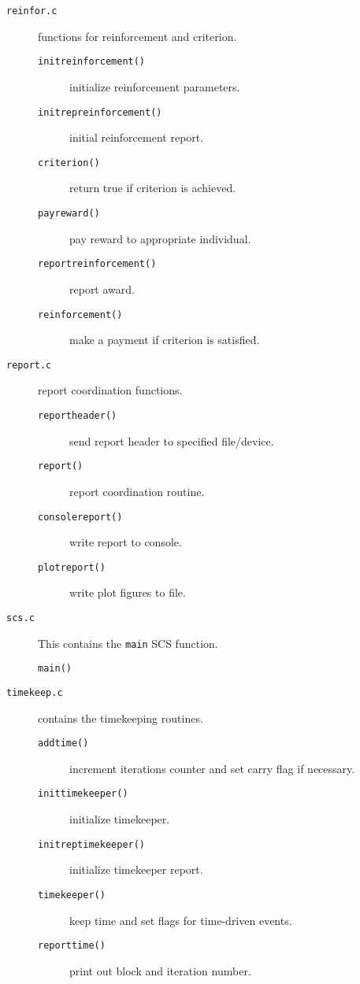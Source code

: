 \begin{description}
\item[\verb!reinfor.c!] functions for reinforcement and
criterion.
  \begin{description}
    \item[\verb!initreinforcement()!] initialize reinforcement
parameters.
    \item[\verb!initrepreinforcement()!] initial reinforcement
report. 
    \item[\verb!criterion()!] return true if criterion is
achieved.  
    \item[\verb!payreward()!] pay reward to appropriate
individual.  
    \item[\verb!reportreinforcement()!] report award.
    \item[\verb!reinforcement()!] make a payment if criterion
is satisfied.
  \end{description}


\item[\verb!report.c!] report coordination functions.
  \begin{description}
    \item[\verb!reportheader()!] send report header to
specified file/device.
    \item[\verb!report()!] report coordination routine. 
    \item[\verb!consolereport()!] write report to console.
    \item[\verb!plotreport()!] write plot figures to file.
  \end{description}


\item[\verb!scs.c!] This contains the {\tt main} SCS function. 
  \begin{description}
    \item[\verb!main()!] 
  \end{description}

\item[\verb!timekeep.c!] contains the timekeeping routines.
  \begin{description}
    \item[\verb!addtime()!] increment iterations counter and
set carry flag if necessary.
    \item[\verb!inittimekeeper()!] initialize timekeeper.
    \item[\verb!initreptimekeeper()!] initialize timekeeper
report.
    \item[\verb!timekeeper()!] keep time and set flags for
time-driven events. 
    \item[\verb!reporttime()!] print out block and iteration
number. 
  \end{description}


\end{description}
